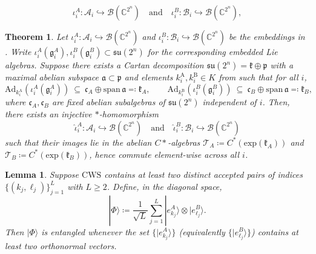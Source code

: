 \documentclass[10pt,a4paper]{amsart}
\newtheorem{theorem}{Theorem}
\newtheorem{lemma}{Lemma}
\begin{document}
    \begin{equation}\label{eq: embeddings}
        \iota_i^A:\mathcal{A}_i\hookrightarrow \mathcal{B}(\mathbb{C}^{2^n}) \quad\text{and}\quad \iota_i^B:\mathcal{B}_i\hookrightarrow \mathcal{B}(\mathbb{C}^{2^n}),
    \end{equation}

    \begin{theorem}\label{theorem: embedding existence}        
        Let $\iota_i^A:\mathcal A_i\hookrightarrow\mathcal B(\mathbb C^{2^n})$ and  $\iota_i^B:\mathcal B_i\hookrightarrow\mathcal B(\mathbb C^{2^n})$ be the embeddings in . Write $\iota_i^A(\mathfrak g_i^A),\iota_i^B(\mathfrak g_i^B)\subset\mathfrak{su}(2^n)$ for the corresponding embedded Lie algebras. Suppose there exists a Cartan decomposition $\mathfrak{su}(2^n)=\mathfrak{k}\oplus\mathfrak{p}$ with a maximal abelian subspace  $\mathfrak{a}\subset \mathfrak{p}$ and elements $k_i^\mathrm{A},k_i^\mathrm{B}\in K$ from  such that for all $i$,
        \begin{equation}\label{eq:cartan-align}     
            \mathrm{Ad}_{k_i^\mathrm{A}}\left(\iota_i^A(\mathfrak{g}_i^A)\right)\ \subseteq\ \mathfrak{c}_A\oplus \mathrm{span}\,\mathfrak{a}\eqqcolon \mathfrak{k}_A,\qquad \mathrm{Ad}_{k_i^\mathrm{B}}\left(\iota_i^B(\mathfrak{g}_i^B)\right)\ \subseteq\ \mathfrak{c}_B\oplus \mathrm{span}\,\mathfrak{a}\eqqcolon \mathfrak{k}_B,
        \end{equation}
        where $\mathfrak{c}_A,\mathfrak{c}_B$ are fixed abelian subalgebras of $\mathfrak{su}(2^n)$ independent of $i$.
        Then, there exists an injective $*$-homomorphism 
        \begin{equation}
            \widehat{\iota}_i^A: \mathcal{A}_i \hookrightarrow \mathcal{B}(\mathbb{C}^{2^n})\quad\text{and}\quad \widehat{\iota}_i^B:\mathcal{B}_i\hookrightarrow \mathcal{B}(\mathbb{C}^{2^n})
        \end{equation}
        such that their images lie in the abelian $C*$-algebras $\mathcal{T}_A\coloneqq C^*(\mathrm{exp}(\mathfrak{k}_A))$ and $\mathcal{T}_B\coloneqq C^*(\mathrm{exp}(\mathfrak{k}_B))$, hence commute element-wise across all $i$. 
    \end{theorem}

    \begin{lemma}\label{lemma: entangled-CWS}
        Suppose $\mathrm{CWS}$ contains at least two distinct accepted pairs of indices $\{(k_j,\ell_j)\}_{j=1}^{L}$ with $L\ge 2$. Define, in the diagonal space,
        \begin{equation}
            |\Phi\rangle \coloneqq \frac{1}{\sqrt{L}}\sum_{j=1}^{L} |e_{k_j}^A\rangle\otimes|e_{\ell_j}^B\rangle.
        \end{equation}
        Then $|\Phi\rangle$ is entangled whenever the set $\{|e_{k_j}^A\rangle\}$ (equivalently $\{|e_{\ell_j}^B\rangle\}$) contains at least two orthonormal vectors.
    \end{lemma}
\end{document}
